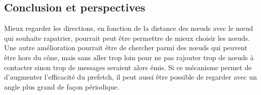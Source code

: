 \subsection{Conclusion et perspectives}
Mieux regarder les directions, en fonction de la distance des nœuds avec le nœud qui souhaite rapatrier, pourrait peut être permettre de mieux choisir les nœuds.
Une autre amélioration pourrait être de chercher parmi des nœuds qui peuvent être hors du cône, mais sans aller trop loin pour ne pas rajouter trop de nœuds à contacter sinon trop de messages seraient alors émis. Si ce mécanisme permet de d'augmenter l'efficacité du prefetch, il peut aussi être possible de regarder avec un angle plus grand de façon périodique.


\newpage
